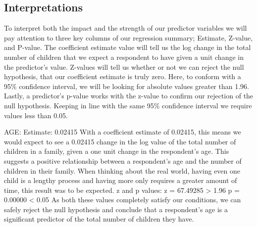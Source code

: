 \documentclass[
]{article}
\begin{document}
\hypertarget{interpretations}{%
\subsection{Interpretations}\label{interpretations}}

To interpret both the impact and the strength of our predictor variables
we will pay attention to three key columns of our regression summary;
Estimate, Z-value, and P-value. The coefficient estimate value will tell
us the log change in the total number of children that we expect a
respondent to have given a unit change in the predictor's value.
Z-values will tell us whether or not we can reject the null hypothesis,
that our coefficient estimate is truly zero. Here, to conform with a
95\% confidence interval, we will be looking for absolute values greater
than 1.96. Lastly, a predictor's p-value works with the z-value to
confirm our rejection of the null hypothesis. Keeping in line with the
same 95\% confidence interval we require values less than 0.05.

AGE: Estimate: 0.02415 With a coefficient estimate of 0.02415, this
means we would expect to see a 0.02415 change in the log value of the
total number of children in a family, given a one unit change in the
respondent's age. This suggests a positive relationship between a
respondent's age and the number of children in their family. When
thinking about the real world, having even one child is a lengthy
process and having more only requires a greater amount of time, this
result was to be expected. z and p values: z = 67.49285 \textgreater{}
1.96 p = 0.00000 \textless{} 0.05 As both these values completely
satisfy our conditions, we can safely reject the null hypothesis and
conclude that a respondent's age is a significant predictor of the total
number of children they have.
\end{document}
